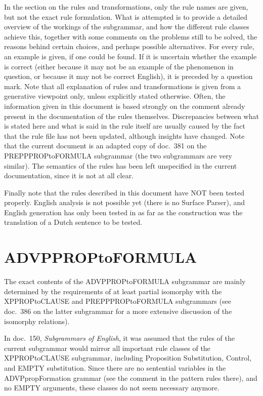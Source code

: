 In the section on the rules and transformations, only the rule names are given, 
but not the exact rule formulation. What is attempted 
is to provide a detailed overview of the workings of the subgrammar, and 
how the different rule classes achieve this,
together with some comments on the problems still to be solved, the reasons 
behind certain choices, and perhaps possible alternatives. For every rule, an 
example is given, if one could be found. 
If it is uncertain whether the example is correct (either 
because it may not be an example of the phenomenon in question, or because it 
may not be correct English), it is preceded by a question mark. Note that all 
explanation of rules and transformations is given from a generative viewpoint
only, unless explicitly stated otherwise. Often, the information given in this 
document is based strongly on the comment already present in the documentation 
of the rules themselves. Discrepancies between what is stated here and what is 
said in the rule itself are usually caused by the fact that the rule file has 
not  been updated, although insights have changed. Note that the current 
document is an adapted copy of doc.\ 381 on the PREPPPROPtoFORMULA subgrammar
(the two subgrammars are very similar). The semantics of the rules 
has been left unspecified in the current documentation, since it is not at all 
clear.

Finally note that the rules described in this document have NOT been tested 
properly. English analysis is not possible yet (there is no Surface Parser), and 
English generation has only been tested in as far as the construction was the 
translation of a Dutch sentence to be tested.

\newpage
\section{ADVPPROPtoFORMULA}
The exact contents of the ADVPPROPtoFORMULA subgrammar are mainly determined 
by the requirements of at least partial isomorphy with the XPPROPtoCLAUSE and  
PREPPPROPtoFORMULA subgrammars (see doc.\ 386 on the latter subgrammar for a 
more extensive discussion of the isomorphy relations). 

In doc.\ 150, {\em Subgrammars of English\/}, it was assumed that the rules of 
the current subgrammar would mirror all important rule classes of the 
XPPROPtoCLAUSE subgrammar, including Proposition Substitution, Control, and 
EMPTY substitution. Since there are no sentential variables in 
the ADVPpropFormation grammar (see the comment in the pattern rules there), and 
no EMPTY arguments, these classes do not seem necessary anymore.

